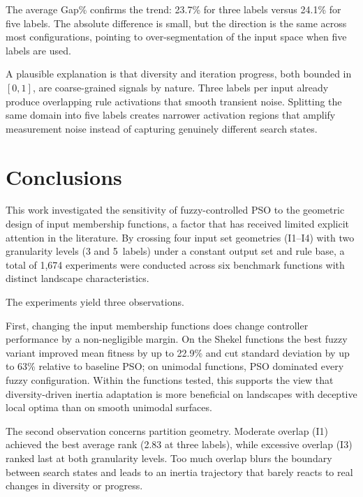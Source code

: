 \documentclass[conference]{IEEEtran}
\begin{document}
The average Gap\% confirms the trend: 23.7\% for three labels versus 24.1\% for five labels. The absolute difference is small, but the direction is the same across most configurations, pointing to over-segmentation of the input space when five labels are used.

A plausible explanation is that diversity and iteration progress, both bounded in $[0, 1]$, are coarse-grained signals by nature. Three labels per input already produce overlapping rule activations that smooth transient noise. Splitting the same domain into five labels creates narrower activation regions that amplify measurement noise instead of capturing genuinely different search states.


\section{Conclusions}
\label{sec:conclusions}

This work investigated the sensitivity of fuzzy-controlled PSO to the geometric design of input membership functions, a factor that has received limited explicit attention in the literature. By crossing four input set geometries (I1--I4) with two granularity levels (3 and 5~labels) under a constant output set and rule base, a total of 1,674 experiments were conducted across six benchmark functions with distinct landscape characteristics.

The experiments yield three observations.

First, changing the input membership functions does change controller performance by a non-negligible margin. On the Shekel functions the best fuzzy variant improved mean fitness by up to 22.9\% and cut standard deviation by up to 63\% relative to baseline PSO; on unimodal functions, PSO dominated every fuzzy configuration. Within the functions tested, this supports the view that diversity-driven inertia adaptation is more beneficial on landscapes with deceptive local optima than on smooth unimodal surfaces.

The second observation concerns partition geometry. Moderate overlap (I1) achieved the best average rank (2.83 at three labels), while excessive overlap (I3) ranked last at both granularity levels. Too much overlap blurs the boundary between search states and leads to an inertia trajectory that barely reacts to real changes in diversity or progress.
\end{document}
